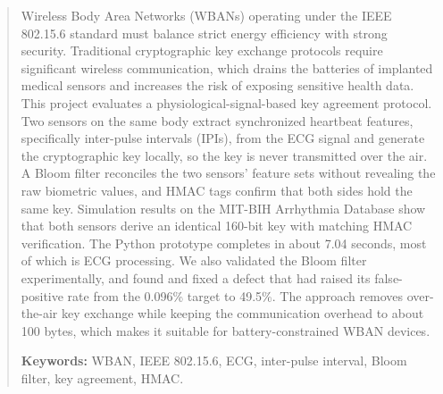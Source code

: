 \begin{abstract}
Wireless Body Area Networks (WBANs) operating under the IEEE 802.15.6 standard must balance strict energy efficiency with strong security. Traditional cryptographic key exchange protocols require significant wireless communication, which drains the batteries of implanted medical sensors and increases the risk of exposing sensitive health data. This project evaluates a physiological-signal-based key agreement protocol. Two sensors on the same body extract synchronized heartbeat features, specifically inter-pulse intervals (IPIs), from the ECG signal and generate the cryptographic key locally, so the key is never transmitted over the air. A Bloom filter reconciles the two sensors' feature sets without revealing the raw biometric values, and HMAC tags confirm that both sides hold the same key. Simulation results on the MIT-BIH Arrhythmia Database show that both sensors derive an identical 160-bit key with matching HMAC verification. The Python prototype completes in about 7.04 seconds, most of which is ECG processing. We also validated the Bloom filter experimentally, and found and fixed a defect that had raised its false-positive rate from the 0.096\% target to 49.5\%. The approach removes over-the-air key exchange while keeping the communication overhead to about 100 bytes, which makes it suitable for battery-constrained WBAN devices.

\medskip
\noindent\textbf{Keywords:} WBAN, IEEE 802.15.6, ECG, inter-pulse interval, Bloom filter, key agreement, HMAC.
\end{abstract}

